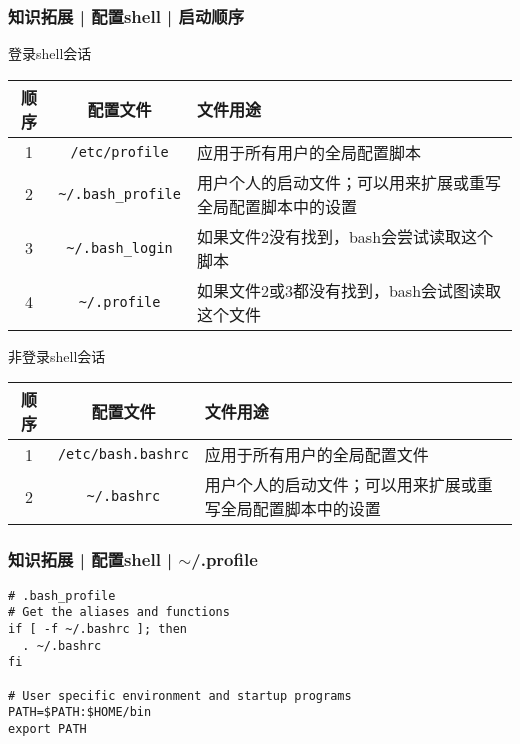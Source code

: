 \begin{frame}
  \frametitle{知识拓展 | 配置shell | 启动顺序}
  \begin{block}{登录shell会话}
  \begin{table}
    \centering
    \begin{tabularx}{\textwidth}{ccX}
      \hline
      \rowcolor{blue!50}顺序 & 配置文件 & 文件用途\\
      \hline
      1 & \verb|/etc/profile| & 应用于所有用户的全局配置脚本\\
      2 & \verb|~/.bash_profile| & 用户个人的启动文件；可以用来扩展或重写全局配置脚本中的设置\\
      3 & \verb|~/.bash_login| & 如果文件2没有找到，bash会尝试读取这个脚本\\
      4 & \alert{\verb|~/.profile|} & 如果文件2或3都没有找到，bash会试图读取这个文件\\
      \hline
    \end{tabularx}
  \end{table}
  \vspace{-1em}
  \end{block}
  \pause
  \begin{block}{非登录shell会话}
  \begin{table}
    \centering
    \begin{tabularx}{\textwidth}{ccX}
      \hline
      \rowcolor{blue!50}顺序 & 配置文件 & 文件用途\\
      \hline
      1 & \verb|/etc/bash.bashrc| & 应用于所有用户的全局配置文件\\
      2 & \alert{\verb|~/.bashrc|} & 用户个人的启动文件；可以用来扩展或重写全局配置脚本中的设置\\
      \hline
    \end{tabularx}
  \end{table}
  \end{block}
\end{frame}

\begin{frame}[fragile]
  \frametitle{知识拓展 | 配置shell | $\sim$/.profile}
  \vspace{-1.5em}
\begin{lstlisting}
# .bash_profile
# Get the aliases and functions
if [ -f ~/.bashrc ]; then
  . ~/.bashrc
fi

# User specific environment and startup programs
PATH=$PATH:$HOME/bin
export PATH
\end{lstlisting}
\end{frame}

